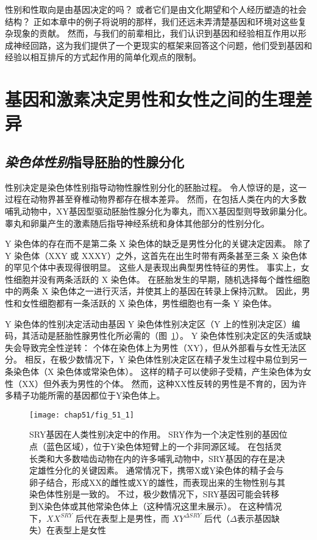 性别和性取向是由基因决定的吗？
或者它们是由文化期望和个人经历塑造的社会结构？
正如本章中的例子将说明的那样，我们还远未弄清楚基因和环境对这些复杂现象的贡献。
然而，与我们的前辈相比，我们认识到基因和经验相互作用以形成神经回路，这为我们提供了一个更现实的框架来回答这个问题，他们受到基因和经验以相互排斥的方式起作用的简单化观点的限制。



\section{基因和激素决定男性和女性之间的生理差异}

\subsection{\textit{染色体性别}指导胚胎的性腺分化}

性别决定是染色体性别指导动物性腺性别分化的胚胎过程。
令人惊讶的是，这一过程在动物界甚至脊椎动物界都存在根本差异。
然而，在包括人类在内的大多数哺乳动物中，XY基因型驱动胚胎性腺分化为睾丸，而XX基因型则导致卵巢分化。
睾丸和卵巢产生的激素随后指导神经系统和身体其他部分的性别分化。


Y 染色体的存在而不是第二条 X 染色体的缺乏是男性分化的关键决定因素。
除了 Y 染色体（XXY 或 XXXY）之外，这首先在出生时带有两条甚至三条 X 染色体的罕见个体中表现得很明显。
这些人是表现出典型男性特征的男性。
事实上，女性细胞并没有两条活跃的 X 染色体。
在胚胎发生的早期，随机选择每个雌性细胞中的两条 X 染色体之一进行灭活，并使其上的基因在转录上保持沉默。
因此，男性和女性细胞都有一条活跃的 X 染色体，男性细胞也有一条 Y 染色体。


Y 染色体的性别决定活动由基因 Y 染色体性别决定区（Y 上的性别决定区）编码，其活动是胚胎性腺男性化所必需的（图~\ref{fig:51_1}）。
Y 染色体性别决定区的失活或缺失会导致完全性逆转：
个体在染色体上为男性（XY），但从外部看与女性无法区分。
相反，在极少数情况下，Y 染色体性别决定区在精子发生过程中易位到另一条染色体（X 染色体或常染色体）。
这样的精子可以使卵子受精，产生染色体为女性（XX）但外表为男性的个体。
然而，这种XX性反转的男性是不育的，因为许多精子功能所需的基因都位于Y染色体上。


\begin{figure}[htbp]
	\centering
	\texttt{[image: chap51/fig\_51\_1]}
	\caption{SRY基因在人类性别决定中的作用。
		SRY作为一个决定性别的基因位点（蓝色区域），位于Y染色体短臂上的一个非同源区域。
		在包括灵长类和大多数啮齿动物在内的许多哺乳动物中，SRY基因的存在是决定雄性分化的关键因素。
		通常情况下，携带X或Y染色体的精子会与卵子结合，形成XX的雌性或XY的雄性，而表现出来的生物性别与其染色体性别是一致的。
		不过，极少数情况下，SRY基因可能会转移到X染色体或其他常染色体上（这种情况这里未展示）。
		在这种情况下，$ XX^{SRY} $ 后代在表型上是男性，而 $XY^{\Delta SRY}$ 后代（$ \Delta $表示基因缺失）在表型上是女性\cite{wilhelm2007sex} }
	\label{fig:51_1}
\end{figure}


